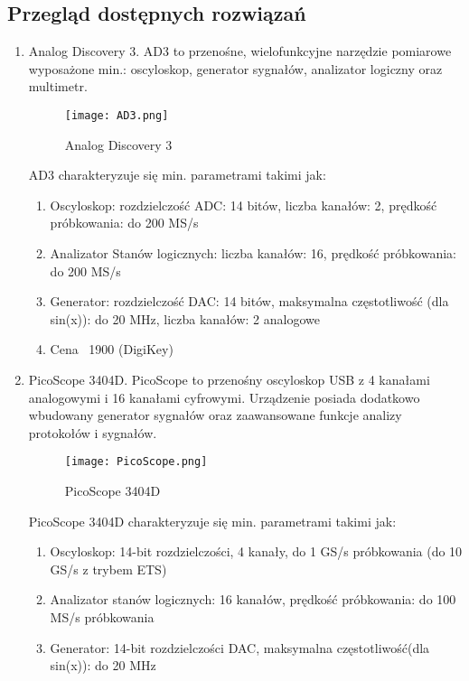 \subsection{Przegląd dostępnych rozwiązań}
    \begin{enumerate}
        \item Analog Discovery 3.
        \newline AD3 to przenośne, wielofunkcyjne narzędzie pomiarowe wyposażone min.:
        oscyloskop, generator sygnałów, analizator logiczny oraz multimetr.
        \begin{figure}[!ht]
        \centering
        \texttt{[image: AD3.png]}
        \caption{Analog Discovery 3}
        \label{fig:AD3}
    \end{figure}

    AD3 charakteryzuje się min. parametrami takimi jak:
    \begin{enumerate}[label=\arabic*.]
        \item Oscyloskop: rozdzielczość ADC: 14 bitów, liczba kanałów: 2, prędkość próbkowania: do 200 MS/s
        \item Analizator Stanów logicznych: liczba kanałów: 16, prędkość próbkowania: do 200 MS/s
        \item Generator: rozdzielczość DAC: 14 bitów, maksymalna częstotliwość (dla sin(x)): do 20 MHz, 
        liczba kanałów: 2 analogowe
        \item Cena ~1900 (DigiKey)
    \end{enumerate}

    \item PicoScope 3404D. 
    \newline PicoScope to przenośny oscyloskop USB z 4 kanałami analogowymi i
    16 kanałami cyfrowymi. Urządzenie posiada dodatkowo wbudowany generator
    sygnałów oraz zaawansowane funkcje analizy protokołów i sygnałów.
        \begin{figure}[!ht]
        \centering
        \texttt{[image: PicoScope.png]}
        \caption{PicoScope 3404D}
        \label{fig:PicoScope}
    \end{figure}

    PicoScope 3404D charakteryzuje się min. parametrami takimi jak:
    \begin{enumerate}[label=\arabic*.]
        \item Oscyloskop: 14-bit rozdzielczości, 4 kanały, do 1 GS/s próbkowania (do 10 GS/s z trybem ETS)
        \item Analizator stanów logicznych: 16 kanałów, prędkość próbkowania: do 100 MS/s próbkowania
        \item Generator: 14-bit rozdzielczości DAC, maksymalna częstotliwość(dla sin(x)): do 20 MHz 
    \end{enumerate}

    \end{enumerate}



